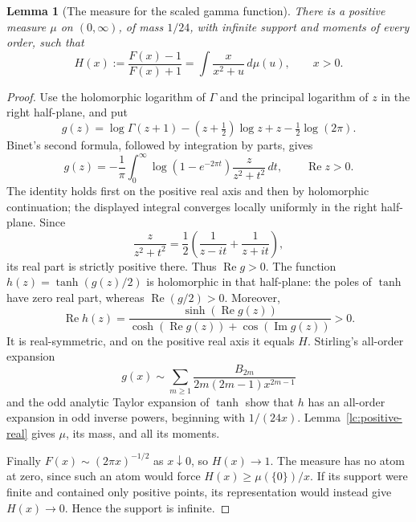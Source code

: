 \documentclass[11pt,a4paper]{article}
\newtheorem{lemma}[theorem]{Lemma}
\theoremstyle{definition}
\theoremstyle{remark}
\numberwithin{equation}{section}
\begin{document}
\begin{lemma}[The measure for the scaled gamma function]
\label{lc:measure}
There is a positive measure $\mu$ on $(0,\infty)$, of mass $1/24$,
with infinite support and moments of every order, such that
\[
 H(x):=\frac{F(x)-1}{F(x)+1}
      =\int\frac{x}{x^2+u}\,d\mu(u),\qquad x>0.
\]
\end{lemma}
\begin{proof}
Use the holomorphic logarithm of $\Gamma$ and the principal logarithm
of $z$ in the right half-plane, and put
\[
 g(z)=\log\Gamma(z+1)-(z+\tfrac12)\log z+z-\tfrac12\log(2\pi).
\]
Binet's second formula, followed by integration by parts, gives
\[
 g(z)=-\frac1\pi\int_0^\infty
          \log(1-e^{-2\pi t})\frac{z}{z^2+t^2}\,dt,
 \qquad \operatorname{Re}z>0.
\]
The identity holds first on the positive real axis and then by
holomorphic continuation; the displayed integral converges locally
uniformly in the right half-plane. Since
\[
 \frac{z}{z^2+t^2}=\frac12\left(\frac1{z-it}+\frac1{z+it}\right),
\]
its real part is strictly positive there. Thus $\operatorname{Re}g>0$.
The function $h(z)=\tanh(g(z)/2)$ is holomorphic in that half-plane:
the poles of $\tanh$ have zero real part, whereas
$\operatorname{Re}(g/2)>0$. Moreover,
\[
 \operatorname{Re}h(z)=
 \frac{\sinh(\operatorname{Re}g(z))}
      {\cosh(\operatorname{Re}g(z))+\cos(\operatorname{Im}g(z))}>0.
\]
It is real-symmetric, and on the positive real axis it equals $H$.
Stirling's all-order expansion
\[
 g(x)\sim\sum_{m\ge1}
       \frac{B_{2m}}{2m(2m-1)x^{2m-1}}
\]
and the odd analytic Taylor expansion of $\tanh$ show that $h$ has
an all-order expansion in odd inverse powers, beginning with
$1/(24x)$. Lemma~\ref{lc:positive-real} gives $\mu$, its mass, and
all its moments.

Finally $F(x)\sim(2\pi x)^{-1/2}$ as $x\downarrow0$, so
$H(x)\to1$. The measure has no atom at zero, since such an atom
would force $H(x)\ge\mu(\{0\})/x$. If its support were finite and
contained only positive points, its representation would instead
give $H(x)\to0$. Hence the support is infinite.
\end{proof}
\end{document}
